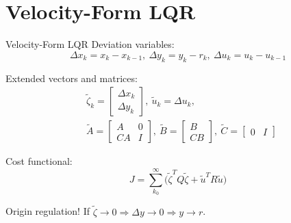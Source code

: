 \section{Velocity-Form LQR}
\begin{frame}{Velocity-Form LQR}
	Deviation variables:
	\begin{equation}\label{eq:VelocityVariables}
		\Delta x_k = x_k - x_{k-1}, \ \Delta y_k = y_k - r_k, \ \Delta u_k = u_k-u_{k-1}
	\end{equation}
	
	Extended vectors and matrices:
	\begin{equation} \label{eq1}
		\begin{split}
			& \tilde{\zeta}_k = \begin{bmatrix} \Delta x_k \\ \Delta y_k	\end{bmatrix}, \ \tilde{u}_k = \Delta u_k, \\
			&\tilde{A} = \begin{bmatrix} A & 0 \\ CA & I	\end{bmatrix}, \ 
			\tilde{B} = \begin{bmatrix} B \\ CB	\end{bmatrix}, \ \tilde{C} = \begin{bmatrix} 0 & I	\end{bmatrix}
		\end{split}
	\end{equation}

	Cost functional:
	\begin{equation}\label{eq:LagrangeProblemDeviation}
		J = \sum_{k_0}^{\infty} \big(\tilde{\zeta}^TQ\tilde{\zeta} + \tilde{u}^TR\tilde{u}\big)
	\end{equation}

	Origin regulation! If $\tilde{\zeta} \rightarrow 0 \Rightarrow  \Delta y \rightarrow 0 \Rightarrow  y \rightarrow r$.
\end{frame}


